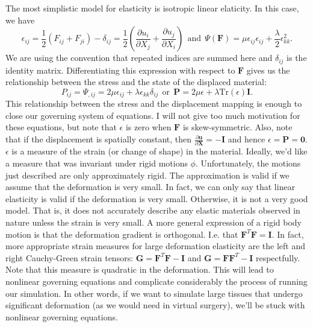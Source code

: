 \documentclass[article]{pcms-l}
\begin{document}
The most simplistic model for elasticity is isotropic linear elaticity. In this case, we have
$$
\epsilon_{ij}=\frac{1}{2}(F_{ij}+F_{ji})-\delta_{ij}=\frac{1}{2}(\frac{\partial{u}_i}{\partial{X}_j}+\frac{\partial{u}_j}{\partial{X}_i}) \ \ \textrm{and} \ \ \Psi(\mathbf{F})=\mu\epsilon_{ij}\epsilon_{ij}+\frac{\lambda}{2}\epsilon_{kk}^2.
$$
We are using the convention that repeated indices are summed here and $\delta_{ij}$ is the identity matrix. Differentiating this expression with respect to $\mathbf{F}$ gives us the relationship between the stress and the state of the displaced material:
$$
P_{ij}=\Psi_{,ij}=2\mu\epsilon_{ij}+\lambda\epsilon_{kk}\delta_{ij} \ \ \textrm{or} \ \ \mathbf{P}=2\mu\epsilon+\lambda\textrm{Tr}(\epsilon)\mathbf{I}.
$$
This relationship between the stress and the displacement mapping is enough to close our governing system of equations. I will not give too much motivation for these equations, but note that $\epsilon$ is zero when $\mathbf{F}$ is skew-symmetric. Also, note that if the displacement is spatially constant, then $\frac{\partial\mathbf{u}}{\partial\mathbf{X}}=-\mathbf{I}$ and hence $\epsilon=\mathbf{P}=\mathbf{0}$. $\epsilon$ is a measure of the strain (or change of shape) in the material. Ideally, we'd like a measure that was invariant under rigid motions $\phi$. Unfortunately, the motions just described are only approximately rigid. The approximation is valid if we assume that the deformation is very small. In fact, we can only say that linear elasticity is valid if the deformation is very small. Otherwise, it is not a very good model. That is, it does not accurately describe any elastic materials observed in nature unless the strain is very small. A more general expression of a rigid body motion is that the deformation gradient is orthogonal. I.e. that $\mathbf{F}^T\mathbf{F}=\mathbf{I}$. In fact, more appropriate strain measures for large deformation elasticity are the left and right Cauchy-Green strain tensors: $\mathbf{G}=\mathbf{F}^T\mathbf{F}-\mathbf{I}$ and  $\mathbf{G}=\mathbf{F}\mathbf{F}^T-\mathbf{I}$ respectfully. Note that this measure is quadratic in the deformation. This will lead to nonlinear governing equations and complicate considerably the process of running our simulation. In other words, if we want to simulate large tissues that undergo significant deformation (as we would need in virtual surgery), we'll be stuck with nonlinear governing equations.
\end{document}
